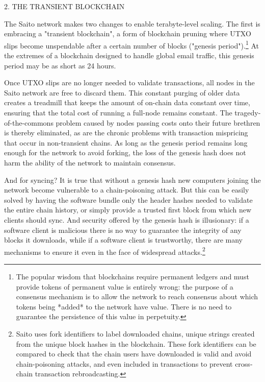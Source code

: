 \documentclass[11.5pt, oneside]{article}   	%
\begin{document}
\begin{multicols}{2}
2. THE TRANSIENT BLOCKCHAIN

The Saito network makes two changes to enable terabyte-level scaling. The first is embracing a "transient blockchain", a form of blockchain pruning where UTXO slips become unspendable after a certain number of blocks ("genesis period").\footnote[1]{The popular wisdom that blockchains require permanent ledgers and must provide tokens of permanent value is entirely wrong: the purpose of a consensus mechanism is to allow the network to reach consensus about which tokens being *added* to the network have value. There is no need to guarantee the persistence of this value in perpetuity.} At the extremes of a blockchain designed to handle global email traffic, this genesis period may be as short as 24 hours.

Once UTXO slips are no longer needed to validate transactions, all nodes in the Saito network are free to discard them. This constant purging of older data creates a treadmill that keeps the amount of on-chain data constant over time, ensuring that the total cost of running a full-node remains constant. The tragedy-of-the-commons problem caused by nodes passing costs onto their future brethren is thereby eliminated, as are the chronic problems with transaction mispricing that occur in non-transient chains. As long as the genesis period remains long enough for the network to avoid forking, the loss of the genesis hash does not harm the ability of the network to maintain consensus.

And for syncing? It is true that without a genesis hash new computers joining the network become vulnerable to a chain-poisoning attack. But this can be easily solved by having the software bundle only the header hashes needed to validate the entire chain history, or simply provide a trusted first block from which new clients should sync. And security offered by the genesis hash is illusionary: if a software client is malicious there is no way to guarantee the integrity of any blocks it downloads, while if a software client is trustworthy, there are many mechanisms to ensure it even in the face of widespread attacks.\footnote[1]{Saito uses fork identifiers to label downloaded chains, unique strings created from the unique block hashes in the blockchain. These fork identifiers can be compared to check that the chain users have downloaded is valid and avoid chain-poisoning attacks, and even included in transactions to prevent cross-chain transaction rebroadcasting.} 


\end{multicols}
\end{document}

